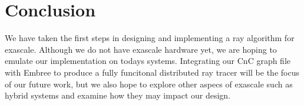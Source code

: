 \section{Conclusion}
\label{sec:conclusion}

We have taken the first steps in designing and implementing a ray algorithm for exascale.  Although we do not have exascale hardware yet, we are hoping to emulate our implementation on todays systems.  Integrating our CnC graph file with Embree to produce a fully funcitonal distributed ray tracer will be the focus of our future work, but we also hope to explore other aspecs of exascale such as hybrid systems and examine how they may impact our design.  

